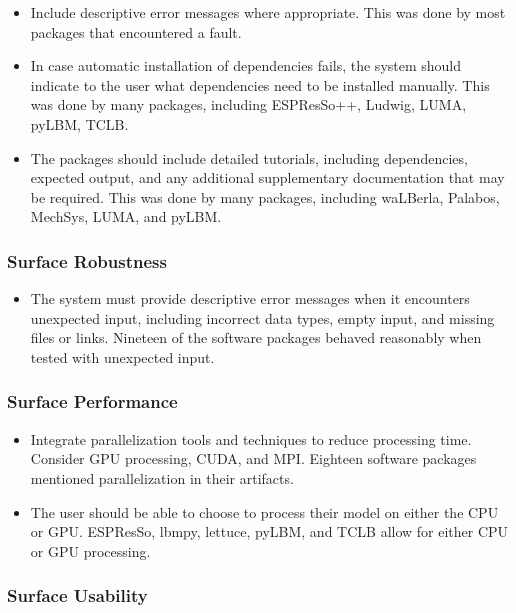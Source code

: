 \documentclass[final, 3p, times, authoryear]{elsarticle}
\begin{document}
\begin{itemize}
	\item Include descriptive error messages where appropriate. This was done by most packages that encountered a fault.
	\item In case automatic installation of dependencies fails, the system should indicate to the user what dependencies need to be installed manually. This was done by many packages, including ESPResSo++, Ludwig, LUMA, pyLBM, TCLB.
	\item The packages should include detailed tutorials, including dependencies, expected output, and any additional supplementary documentation that may be required. This was done by many packages, including waLBerla, Palabos, MechSys, LUMA, and pyLBM.
\end{itemize}

\subsubsection{Surface Robustness}

\begin{itemize}
	\item The system must provide descriptive error messages when it encounters unexpected input, including incorrect data types, empty input, and missing files or links. Nineteen of the software packages behaved reasonably when tested with unexpected input.
\end{itemize}

\subsubsection{Surface Performance}

\begin{itemize}
	\item Integrate parallelization tools and techniques to reduce processing time. Consider GPU processing, CUDA, and MPI. Eighteen software packages mentioned parallelization in their artifacts.
	\item The user should be able to choose to process their model on either the CPU or GPU. ESPResSo, lbmpy, lettuce, pyLBM, and TCLB allow for either CPU or GPU processing.
\end{itemize}

\subsubsection{Surface Usability}
\end{document}
